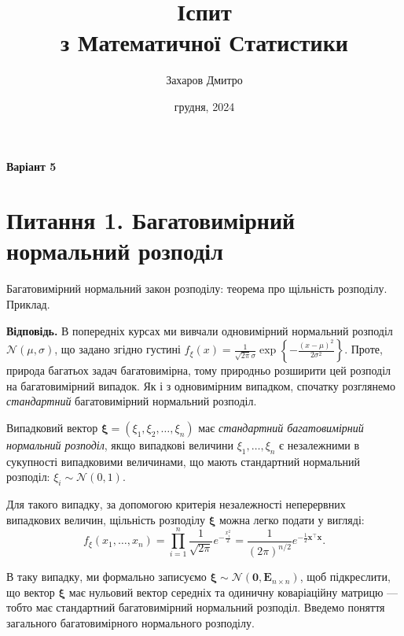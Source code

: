 \documentclass{../hw_template}
\title{\huge\sffamily\bfseries Іспит \\ з Математичної Статистики}
\author{\Large\sffamily Захаров Дмитро}
\date{\sffamily 10 грудня, 2024}
\begin{document}
\pagestyle{fancy}

\maketitle

\begin{center}
    \textbf{Варіант 5}
\end{center}

\tableofcontents

\pagebreak

\section{Питання 1. Багатовимірний нормальний розподіл}

\begin{problems}
    Багатовимірний нормальний закон розподілу: теорема про щільність розподілу.
    Приклад.
\end{problems}

\textbf{Відповідь.} В попередніх курсах ми вивчали одновимірний нормальний
розподіл $\mathcal{N}(\mu,\sigma)$, що задано згідно густині 
$f_{\xi}(x) = \frac{1}{\sqrt{2\pi}\sigma}\exp\left\{-\frac{(x-\mu)^2}{2\sigma^2}\right\}$. Проте,
природа багатьох задач багатовимірна, тому природньо розширити цей розподіл на
багатовимірний випадок. Як і з одновимірним випадком, спочатку розглянемо
\textit{стандартний} багатовимірний нормальний розподіл.

\begin{definition}
    Випадковий вектор $\boldsymbol{\xi} = (\xi_1, \xi_2, \ldots, \xi_n)$ має
    \textit{стандартний багатовимірний нормальний розподіл}, якщо випадкові 
    величини $\xi_1,\dots,\xi_n$ є незалежними в сукупності випадковими величинами,
    що мають стандартний нормальний розподіл: $\xi_i \sim \mathcal{N}(0,1)$.
\end{definition}

Для такого випадку, за допомогою критерія незалежності неперервних випадкових
величин, щільність розподілу $\boldsymbol{\xi}$ можна легко подати у вигляді:
\begin{equation*}
    f_{\xi}(x_1,\dots,x_n) = \prod_{i=1}^n \frac{1}{\sqrt{2\pi}}e^{-\frac{x_i^2}{2}} = \frac{1}{(2\pi)^{n/2}}e^{-\frac{1}{2}\mathbf{x}^{\top}\mathbf{x}}.
\end{equation*}

В таку випадку, ми формально записуємо $\boldsymbol{\xi} \sim \mathcal{N}(\mathbf{0}, \boldsymbol{E}_{n \times n})$, щоб 
підкреслити, що вектор $\boldsymbol{\xi}$ має нульовий вектор середніх та одиничну коваріаційну матрицю --- тобто 
має стандартний багатовимірний нормальний розподіл. Введемо поняття загального багатовимірного нормального розподілу.
\end{document}
